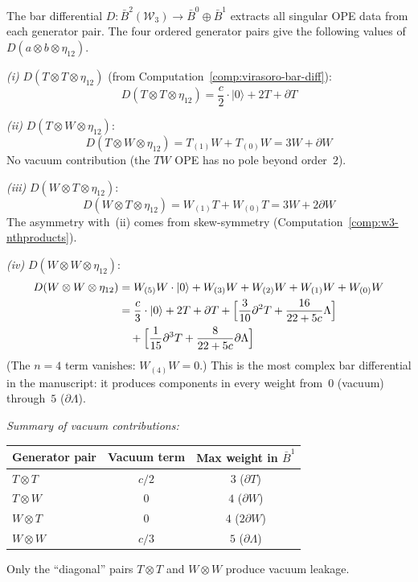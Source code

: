 \begin{computation}\label{comp:w3-bar-degree2}
The bar differential $D \colon \bar{B}^2(\mathcal{W}_3) \to \bar{B}^0 \oplus \bar{B}^1$
extracts all singular OPE data from each generator pair.
The four ordered generator pairs give the following values of
$D(a \otimes b \otimes \eta_{12})$.

\emph{(i)} $D(T \otimes T \otimes \eta_{12})$
(from Computation~\ref{comp:virasoro-bar-diff}):
\[
D(T \otimes T \otimes \eta_{12}) = \frac{c}{2}\cdot|0\rangle + 2T + \partial T
\]

\emph{(ii)} $D(T \otimes W \otimes \eta_{12})$:
\[
D(T \otimes W \otimes \eta_{12}) = T_{(1)}W + T_{(0)}W = 3W + \partial W
\]
No vacuum contribution (the $TW$ OPE has no pole beyond order~$2$).

\emph{(iii)} $D(W \otimes T \otimes \eta_{12})$:
\[
D(W \otimes T \otimes \eta_{12}) = W_{(1)}T + W_{(0)}T = 3W + 2\partial W
\]
The asymmetry with~(ii) comes from skew-symmetry
(Computation~\ref{comp:w3-nthproducts}).

\emph{(iv)} $D(W \otimes W \otimes \eta_{12})$:
\begin{align*}
D(W \otimes W \otimes \eta_{12})
&= W_{(5)}W \cdot |0\rangle + W_{(3)}W + W_{(2)}W + W_{(1)}W + W_{(0)}W \\
&= \frac{c}{3}\cdot|0\rangle + 2T + \partial T
 + \Bigl[\frac{3}{10}\partial^2 T + \frac{16}{22+5c}\Lambda\Bigr] \\
&\quad + \Bigl[\frac{1}{15}\partial^3 T + \frac{8}{22+5c}\partial\Lambda\Bigr]
\end{align*}
(The $n=4$ term vanishes: $W_{(4)}W = 0$.)
This is the most complex bar differential in the manuscript: it produces components
in every weight from~$0$ (vacuum) through~$5$ ($\partial\Lambda$).

\emph{Summary of vacuum contributions:}
\begin{center}
\begin{tabular}{lcc}
\textbf{Generator pair} & \textbf{Vacuum term} & \textbf{Max weight in $\bar{B}^1$} \\
\hline
$T \otimes T$ & $c/2$ & $3$ ($\partial T$) \\
$T \otimes W$ & $0$ & $4$ ($\partial W$) \\
$W \otimes T$ & $0$ & $4$ ($2\partial W$) \\
$W \otimes W$ & $c/3$ & $5$ ($\partial\Lambda$)
\end{tabular}
\end{center}
Only the ``diagonal'' pairs $T \otimes T$ and $W \otimes W$ produce vacuum leakage.
\end{computation}


